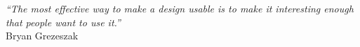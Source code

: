 \cleardoublepage
\thispagestyle{plain}

\vspace*{8cm}

\begin{flushright}
   \textsl{``The most effective way to make a design usable is to make it interesting enough that people want to use it.''} \\
\vspace*{1.5cm}
           Bryan Grezeszak
\end{flushright}
